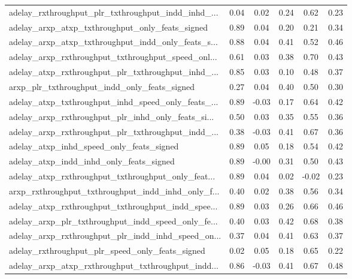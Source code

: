 \begin{tabular}{|l|*{4}{c}|r|}
adelay\_rxthroughput\_plr\_txthroughput\_indd\_inhd\_... & 0.04 &  0.02 &    0.24 &       0.62 &  0.23 \\
adelay\_arxp\_atxp\_txthroughput\_only\_feats\_signed    & 0.89 &  0.04 &    0.20 &       0.21 &  0.34 \\
adelay\_arxp\_atxp\_txthroughput\_indd\_only\_feats\_s... & 0.88 &  0.04 &    0.41 &       0.52 &  0.46 \\
adelay\_arxp\_rxthroughput\_txthroughput\_speed\_onl... & 0.61 &  0.03 &    0.38 &       0.70 &  0.43 \\
adelay\_atxp\_rxthroughput\_plr\_txthroughput\_inhd\_... & 0.85 &  0.03 &    0.10 &       0.48 &  0.37 \\
arxp\_plr\_txthroughput\_indd\_only\_feats\_signed       & 0.27 &  0.04 &    0.40 &       0.50 &  0.30 \\
adelay\_atxp\_txthroughput\_inhd\_speed\_only\_feats\_... & 0.89 & -0.03 &    0.17 &       0.64 &  0.42 \\
adelay\_arxp\_rxthroughput\_plr\_inhd\_only\_feats\_si... & 0.50 &  0.03 &    0.35 &       0.55 &  0.36 \\
adelay\_arxp\_rxthroughput\_plr\_txthroughput\_indd\_... & 0.38 & -0.03 &    0.41 &       0.67 &  0.36 \\
adelay\_atxp\_inhd\_speed\_only\_feats\_signed           & 0.89 &  0.05 &    0.18 &       0.54 &  0.42 \\
adelay\_atxp\_indd\_inhd\_only\_feats\_signed            & 0.89 & -0.00 &    0.31 &       0.50 &  0.43 \\
adelay\_atxp\_rxthroughput\_txthroughput\_only\_feat... & 0.89 &  0.04 &    0.02 &      -0.02 &  0.23 \\
arxp\_rxthroughput\_txthroughput\_indd\_inhd\_only\_f... & 0.40 &  0.02 &    0.38 &       0.56 &  0.34 \\
adelay\_atxp\_rxthroughput\_txthroughput\_indd\_spee... & 0.89 &  0.03 &    0.26 &       0.66 &  0.46 \\
adelay\_arxp\_plr\_txthroughput\_indd\_speed\_only\_fe... & 0.40 &  0.03 &    0.42 &       0.68 &  0.38 \\
adelay\_arxp\_rxthroughput\_plr\_indd\_inhd\_speed\_on... & 0.37 &  0.04 &    0.41 &       0.63 &  0.37 \\
adelay\_rxthroughput\_plr\_speed\_only\_feats\_signed    & 0.02 &  0.05 &    0.18 &       0.65 &  0.22 \\
adelay\_arxp\_atxp\_rxthroughput\_txthroughput\_indd... & 0.86 & -0.03 &    0.41 &       0.67 &  0.48 \\

\end{tabular}
